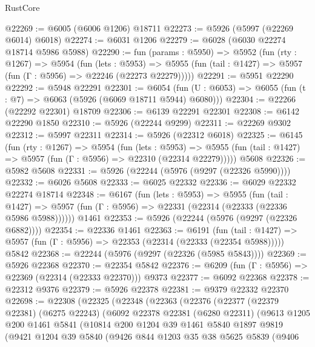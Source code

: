 \begin{lexlean}{RustCore}
\begin{coremodule}
@22269 := @6005 (@6006 @1206) @18711
@22273 := @5926 (@5997 (@22269 @6014) @6018)
@22274 := @6031 @1206
@22279 := @6028 (@6030 @22274 @18714 @5986 @5988)
@22290 := fun (params : @5950) =>
  @5952
    (fun (rty : @1267) =>
    @5954
      (fun (lets : @5953) =>
      @5955 (fun (tail : @1427) => @5957 (fun (Γ : @5956) => @22246 (@22273 @22279)))))
@22291 := @5951 @22290
@22292 := @5948 @22291
@22301 := @6054
    (fun (U : @6053) => @6055 (fun (t : @7) => @6063 (@5926 (@6069 @18711 @5944) @6080)))
@22304 := @22266 (@22292 @22301) @18709
@22306 := @6139 @22291 @22301
@22308 := @6142 @22290 @1850
@22310 := @5926 (@22244 @9299)
@22311 := @22269 @9302
@22312 := @5997 @22311
@22314 := @5926 (@22312 @6018)
@22325 := @6145
    (fun (rty : @1267) =>
    @5954
      (fun (lets : @5953) =>
      @5955 (fun (tail : @1427) => @5957 (fun (Γ : @5956) => @22310 (@22314 @22279)))))
    @5608
@22326 := @5982 @5608
@22331 := @5926 (@22244 (@5976 (@9297 (@22326 @5990))))
@22332 := @6026 @5608
@22333 := @6025 @22332
@22336 := @6029 @22332 @22274 @18714
@22348 := @6167
    (fun (lets : @5953) =>
    @5955
      (fun (tail : @1427) =>
      @5957 (fun (Γ : @5956) => @22331 (@22314 (@22333 (@22336 @5986 @5988))))))
    @1461
@22353 := @5926 (@22244 (@5976 (@9297 (@22326 @6882))))
@22354 := @22336 @1461
@22363 := @6191
    (fun (tail : @1427) => @5957 (fun (Γ : @5956) => @22353 (@22314 (@22333 (@22354 @5988)))))
    @5842
@22368 := @22244 (@5976 (@9297 (@22326 (@5985 @5843))))
@22369 := @5926 @22368
@22370 := @22354 @5842
@22376 := @6209 (fun (Γ : @5956) => @22369 (@22314 (@22333 @22370))) @9373
@22377 := @6092 @22368
@22378 := @22312 @9376
@22379 := @5926 @22378
@22381 := @9379 @22332 @22370
@22698 := @22308
    (@22325
      (@22348
        (@22363
          (@22376
            (@22377
              (@22379 @22381)
              (@6275 @22243)
              (@6092
                @22378
                @22381
                (@6280 @22311)
                (@9613
                  @1205
                  @200
                  @1461
                  @5841
                  (@10814
                    @200
                    @1204
                    @39
                    @1461
                    @5840
                    @1897
                    @9819
                    (@9421
                      @1204
                      @39
                      @5840
                      (@9426
                        @844
                        @1203
                        @35
                        @38
                        @5625
                        @5839
                        (@9406

\end{coremodule}
\end{lexlean}
